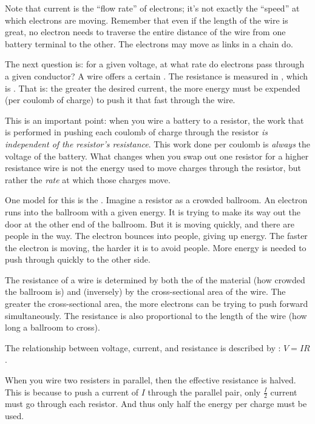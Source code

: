 \documentclass[11pt, oneside]{amsart}
\begin{document}
Note that current is the ``flow rate'' of electrons; it's not exactly
the ``speed'' at which electrons are moving. Remember that even if the
length of the wire is great, no electron needs to traverse the entire
distance of the wire from one battery terminal to the other. The
electrons may move as links in a chain do.

The next question is: for a given voltage, at what rate do electrons
pass through a given conductor? A wire offers a certain
. The resistance is measured in , which
is . That is: the greater the
desired current, the more energy must be expended (per coulomb of
charge) to push it that fast through the wire.

This is an important point: when you wire a battery to a resistor, the
work that is performed in pushing each coulomb of charge through the
resistor \emph{is independent of the resistor's resistance}. This work
done per coulomb is \emph{always} the voltage of the battery. What
changes when you swap out one resistor for a higher resistance wire is
not the energy used to move charges through the resistor, but rather the
\emph{rate} at which those charges move.

One model for this is the . Imagine a resistor as a
crowded ballroom. An electron runs into the ballroom with a given
energy. It is trying to make its way out the door at the other end of
the ballroom. But it is moving quickly, and there are people in the way.
The electron bounces into people, giving up energy. The faster the
electron is moving, the harder it is to avoid people. More energy is
needed to push through quickly to the other side.


The resistance of a wire is determined by both the 
of the material (how crowded the ballroom is) and (inversely) by the
cross-sectional area of the wire. The greater the cross-sectional area,
the more electrons can be trying to push forward simultaneously. The
resistance is also proportional to the length of the wire (how long a
ballroom to cross).

The relationship between voltage, current, and resistance is described
by : $V=IR$.

When you wire two resisters in parallel, then the effective resistance
is halved. This is because to push a current of $I$ through the parallel
pair, only $\frac{I}{2}$ current must go through each resistor. And thus
only half the energy per charge must be used.
\end{document}
